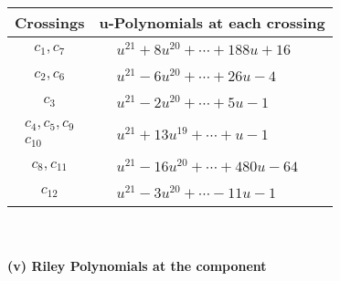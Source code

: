 \documentclass[1p]{elsarticle_modified}
\theoremstyle{definition}
\begin{document}
\begin{tabular}{m{50pt}|m{274pt}}
Crossings & \hspace{64pt}u-Polynomials at each crossing \\
\hline $$\begin{aligned}c_{1},c_{7}\end{aligned}$$&$\begin{aligned}
&u^{21}+8 u^{20}+\cdots+188 u+16
\end{aligned}$\\
\hline $$\begin{aligned}c_{2},c_{6}\end{aligned}$$&$\begin{aligned}
&u^{21}-6 u^{20}+\cdots+26 u-4
\end{aligned}$\\
\hline $$\begin{aligned}c_{3}\end{aligned}$$&$\begin{aligned}
&u^{21}-2 u^{20}+\cdots+5 u-1
\end{aligned}$\\
\hline $$\begin{aligned}c_{4},c_{5},c_{9}\\c_{10}\end{aligned}$$&$\begin{aligned}
&u^{21}+13 u^{19}+\cdots+u-1
\end{aligned}$\\
\hline $$\begin{aligned}c_{8},c_{11}\end{aligned}$$&$\begin{aligned}
&u^{21}-16 u^{20}+\cdots+480 u-64
\end{aligned}$\\
\hline $$\begin{aligned}c_{12}\end{aligned}$$&$\begin{aligned}
&u^{21}-3 u^{20}+\cdots-11 u-1
\end{aligned}$\\
\hline
\end{tabular}\\~\\
\newpage\renewcommand{\arraystretch}{1}
\flushleft \textbf{(v) Riley Polynomials at the component}\newline \\
\end{document}
